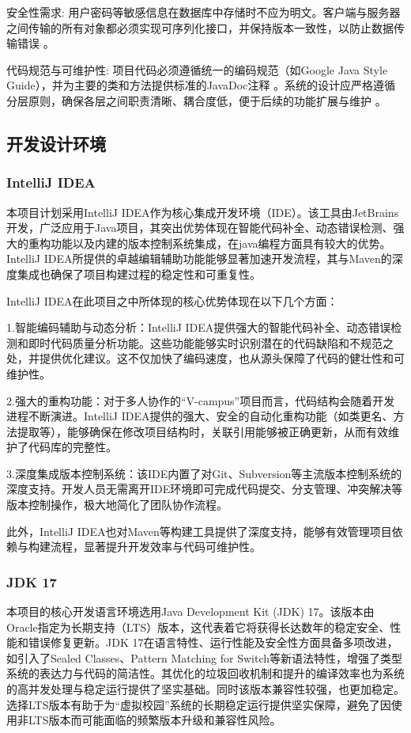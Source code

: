 安全性需求: 用户密码等敏感信息在数据库中存储时不应为明文。客户端与服务器之间传输的所有对象都必须实现可序列化接口，并保持版本一致性，以防止数据传输错误 。

代码规范与可维护性: 项目代码必须遵循统一的编码规范（如Google Java Style Guide），并为主要的类和方法提供标准的JavaDoc注释 。系统的设计应严格遵循分层原则，确保各层之间职责清晰、耦合度低，便于后续的功能扩展与维护 。

\subsection{开发设计环境}

\subsubsection{IntelliJ IDEA}

本项目计划采用IntelliJ IDEA作为核心集成开发环境（IDE）。该工具由JetBrains开发，广泛应用于Java项目，其突出优势体现在智能代码补全、动态错误检测、强大的重构功能以及内建的版本控制系统集成，在java编程方面具有较大的优势。IntelliJ IDEA所提供的卓越编辑辅助功能能够显著加速开发流程，其与Maven的深度集成也确保了项目构建过程的稳定性和可重复性。

IntelliJ IDEA在此项目之中所体现的核心优势体现在以下几个方面：

1.智能编码辅助与动态分析：IntelliJ IDEA提供强大的智能代码补全、动态错误检测和即时代码质量分析功能。这些功能能够实时识别潜在的代码缺陷和不规范之处，并提供优化建议。这不仅加快了编码速度，也从源头保障了代码的健壮性和可维护性。

2.强大的重构功能：对于多人协作的“V-campus”项目而言，代码结构会随着开发进程不断演进。IntelliJ IDEA提供的强大、安全的自动化重构功能（如类更名、方法提取等），能够确保在修改项目结构时，关联引用能够被正确更新，从而有效维护了代码库的完整性。

3.深度集成版本控制系统：该IDE内置了对Git、Subversion等主流版本控制系统的深度支持。开发人员无需离开IDE环境即可完成代码提交、分支管理、冲突解决等版本控制操作，极大地简化了团队协作流程。

此外，IntelliJ IDEA也对Maven等构建工具提供了深度支持，能够有效管理项目依赖与构建流程，显著提升开发效率与代码可维护性。

\subsubsection{JDK 17}

本项目的核心开发语言环境选用Java Development Kit (JDK) 17。该版本由Oracle指定为长期支持（LTS）版本，这代表着它将获得长达数年的稳定安全、性能和错误修复更新。JDK 17在语言特性、运行性能及安全性方面具备多项改进，如引入了Sealed Classes、Pattern Matching for Switch等新语法特性，增强了类型系统的表达力与代码的简洁性。其优化的垃圾回收机制和提升的编译效率也为系统的高并发处理与稳定运行提供了坚实基础。同时该版本兼容性较强，也更加稳定。选择LTS版本有助于为“虚拟校园”系统的长期稳定运行提供坚实保障，避免了因使用非LTS版本而可能面临的频繁版本升级和兼容性风险。

